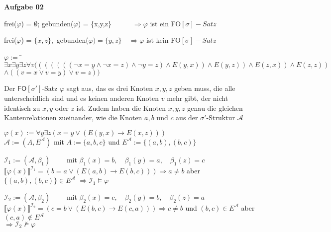 \documentclass[a4paper,10pt]{article}
\begin{document}
	\textbf{Aufgabe 02}
	\begin{compactenum} [(a)]
		\item \begin{compactenum} [(i)]
			\item frei($\varphi$) = $ \emptyset$; gebunden($\varphi$) = \{x,y,z\}$ \qquad \quad \Longrightarrow \varphi $ ist ein FO$[\sigma]-Satz $
			\item frei($\varphi$) = $ \{x,z\},$ gebunden($\varphi) = \{y,z\} \quad \Longrightarrow \varphi $ ist kein FO$[\sigma]-Satz $
		\end{compactenum} 
		\item \begin{tabbing}
			$ \varphi := $ \= $\exists x \exists y \exists z \forall v (((((((\lnot x = y \wedge \lnot x = z) \wedge \lnot y = z) \wedge E(y,x)) \wedge E(y,z)) \wedge E(z,x)) \wedge E(z,z)) $ \\
			\> $\wedge ((v=x \vee v=y )\vee v=z))$
		\end{tabbing}
		Der $\mathsf{FO}[\sigma']$-Satz $ \varphi $ sagt aus, das es drei Knoten $x,y,z$ geben muss, die alle unterscheidlich sind und es keinen anderen Knoten $v$ mehr gibt, der nicht identisch zu $x,y$ oder $z$ ist. Zudem haben die Knoten $x,y,z$ genau die gleichen Kantenrelationen zueinander, wie die Knoten $a,b$ und $c$ aus der $ \sigma'$-Struktur $ \mathcal{A} $ \ \\
		\item $ \varphi(x) := \forall y \exists z (x = y \vee (E(y,x) \rightarrow E(x,z))) $\\
		$ \mathcal{A} := (A, E^\mathcal{A})$ mit $A:= \{a,b,c\}$ und $ E^\mathcal{A} := \{(a,b),(b,c)\} $
		\begin{compactitem}
			\item $ \mathcal{I}_1 :=(\mathcal{A},\beta_1) \qquad $ mit $ \beta_1(x) = b, \quad \beta_1(y) = a, \quad \beta_1(z) = c $\\
			$\llbracket\varphi(x)\rrbracket^{\mathcal{I}_1} =(b=a \vee (E(a,b)\rightarrow E(b,c))) \Rightarrow a \neq b $ aber $ \{(a,b), (b,c)\} \in E^\mathcal{A}$
			$\Rightarrow \mathcal{I}_1 \models \varphi $
			\item $ \mathcal{I}_2 :=(\mathcal{A},\beta_2) \qquad $ mit $ \beta_2(x) = c, \quad \beta_2(y) = b, \quad \beta_2(z) = a $\\
			$\llbracket\varphi(x)\rrbracket^{\mathcal{I}_2} =(c=b \vee (E(b,c)\rightarrow E(c,a))) \Rightarrow c \neq b $ und $ (b,c) \in E^\mathcal{A} $ aber $ (c,a) \not\in E^\mathcal{A} $\\
			$ \Rightarrow \mathcal{I}_2 \not\models \varphi $
		\end{compactitem}
	\end{compactenum} \
	
\end{document}
